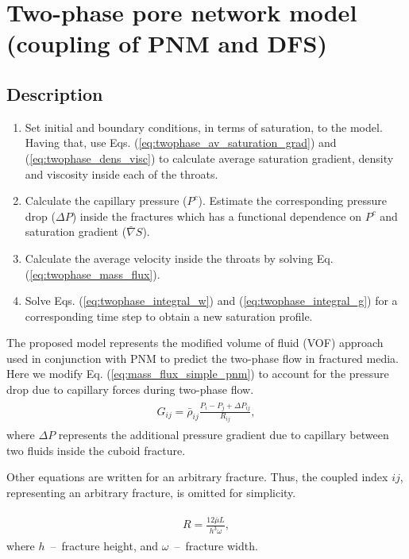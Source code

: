 \documentclass[a4paper,12pt]{extreport}
\begin{document}
\newpage
 \section*{Two-phase pore network model (coupling of  PNM and DFS)}
 
 \subsection*{Description} \label{s1}
 \begin{enumerate}
 	\item Set initial and boundary conditions, in terms of saturation, to the model. Having that, use Eqs. (\ref{eq:twophase_av_saturation_grad}) and (\ref{eq:twophase_dens_visc}) to calculate average saturation gradient, density and viscosity inside each of the throats. 
 	\item Calculate the capillary pressure ($P^c$). Estimate the corresponding pressure drop ($\Delta P$) inside the fractures which has a functional dependence on $P^c$ and saturation gradient ($\bar{\nabla} S$).
 	\item Calculate the average velocity inside the throats by solving Eq. (\ref{eq:twophase_mass_flux}).
 	\item Solve Eqs. (\ref{eq:twophase_integral_w}) and (\ref{eq:twophase_integral_g}) for a corresponding time step to obtain a new saturation profile.
 \end{enumerate}
 
 The proposed model represents the modified volume of fluid (VOF) approach used in conjunction with PNM to predict the two-phase flow in fractured media.  
 Here we modify Eq. (\ref{eq:mass_flux_simple_pnm}) to account for the pressure drop due to capillary forces during two-phase flow. 
 \begin{eqnarray}
 \begin{gathered}
 \label{eq:twophase_mass_flux}
 G_{ij} = \bar{\rho}_{ij} \frac{P_{i} - P_{j} + \Delta P_{ij}}{R_{ij}},
 \end{gathered}
 \end{eqnarray}
  where $\Delta P$ represents the additional pressure gradient due to capillary between two fluids inside the cuboid fracture.
  
  Other equations are written for an arbitrary fracture. Thus, the coupled index $ij$, representing an arbitrary fracture, is omitted for simplicity.
  
  \begin{eqnarray}
  \begin{gathered}
  \label{eq:twophase_mass_hydr_conductance}
  R = \frac{12 \bar{\mu} L}{h^{3} \omega},
  \end{gathered}
  \end{eqnarray}
  where $h$~--~fracture height, and $\omega$~--~fracture width.
  
\end{document}
